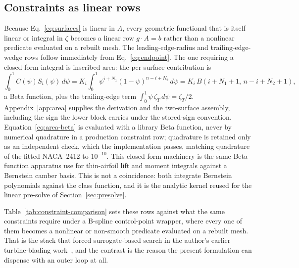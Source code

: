 \subsection{Constraints as linear rows}
\label{sec:constraints}

Because Eq.~\eqref{eq:surfaces} is linear in $A$, every geometric functional
that is itself linear or integral in $\zeta$ becomes a linear row
$g\cdot A = b$ rather than a nonlinear predicate evaluated on a rebuilt mesh.
The leading-edge-radius and trailing-edge-wedge rows follow immediately from
Eq.~\eqref{eq:endpoint}. The one requiring a closed-form integral is inscribed
area: the per-surface contribution is
\begin{equation}
  \int_0^1 C(\psi)S_i(\psi)\,d\psi
    = K_i \int_0^1 \psi^{i+N_1}(1-\psi)^{n-i+N_2}\,d\psi
    = K_i\,B(i+N_1+1,\, n-i+N_2+1),
  \label{eq:area-beta}
\end{equation}
a Beta function, plus the trailing-edge term
$\int_0^1 \psi\,\zeta_T\,d\psi = \zeta_T/2$. Appendix~\ref{app:area} supplies
the derivation and the two-surface assembly, including the sign the lower
block carries under the stored-sign convention.
Equation~\eqref{eq:area-beta} is evaluated with a library Beta function,
never by numerical quadrature in a production constraint row; quadrature is
retained only as an independent check, which the implementation passes,
matching quadrature of the fitted NACA~2412 to $10^{-10}$. This closed-form
machinery is the same Beta-function apparatus \citet{joseph2021closed} use for
thin-airfoil lift and moment integrals against a Bernstein camber basis. This
is not a coincidence: both integrate Bernstein polynomials against the class
function, and it is the analytic kernel reused for the linear pre-solve of
Section~\ref{sec:presolve}.

Table~\ref{tab:constraint-comparison} sets these rows against what the same
constraints require under a B-spline control-point wrapper, where every one of
them becomes a nonlinear or non-smooth predicate evaluated on a rebuilt mesh.
That is the stack that forced surrogate-based search in the author's earlier
turbine-blading work~\citep{sathish2019sco2}, and the contrast is the reason
the present formulation can dispense with an outer loop at all.

